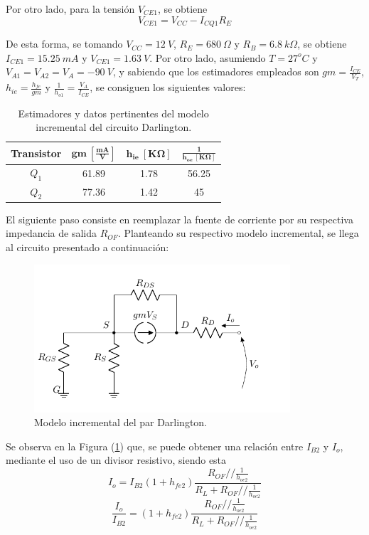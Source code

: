 Por otro lado, para la tensión $V_{CE1}$, se obtiene
\begin{equation}
	V_{CE1} = V_{CC} - I_{CQ1} R_E
\end{equation}

De esta forma, se tomando $V_{CC} = 12 \ V$, $R_E = 680 \ \Omega$ y $R_B = 6.8 \ k\Omega$, se obtiene $I_{CE1} = 15.25 \ mA$ y $V_{CE1} = 1.63 \ V$. Por otro lado, asumiendo $T = 27^o C$ y $V_{A1} = V_{A2} = V_A = -90 \ V$, y sabiendo que los estimadores empleados son $gm = \frac{I_{CE}}{V_T}$, $h_{ie} = \frac{h_{fe}}{gm}$ y $\frac{1}{h_{o1}} = \frac{V_A}{I_{CE}}$, se consiguen los siguientes valores:
\begin{table}[H]
\centering
\begin{tabular}{cccc}
\hline
\textbf{Transistor} & $\mathbf{gm \ \left[ \frac{mA}{V} \right]}$ & $\mathbf{h_{ie} \ \left[ K\Omega \right]}$ & $\mathbf{\frac{1}{h_{oe} \ \left[ K\Omega \right]}}$ \\
\hline
$Q_1$ & 61.89 & 1.78 & 56.25 \\
$Q_2$ & 77.36 & 1.42 & 45	\\
\hline
\end{tabular}
\caption{Estimadores y datos pertinentes del modelo incremental del circuito Darlington.}
\label{tab:estim}
\end{table}

El siguiente paso consiste en reemplazar la fuente de corriente por su respectiva impedancia de salida $R_{OF}$. Planteando su respectivo modelo incremental, se llega al circuito presentado a continuación: 
\begin{figure}[H]
\centering
	\includegraphics[width=0.85\textwidth, page=3]{Imagenes/ModeloIncremental.pdf}
	\caption{Modelo incremental del par Darlington.}
\label{fig:incdar}
\end{figure}

Se observa en la Figura (\ref{fig:incdar}) que, se puede obtener una relación entre $I_{B2}$ y $I_o$, mediante el uso de un divisor resistivo, siendo esta
\begin{equation*}
	I_o = I_{B2} \left( 1 + h_{fe2} \right) \frac{R_{OF} // \frac{1}{h_{oe2}}}{R_L + R_{OF} // \frac{1}{h_{oe2}}}
\end{equation*}
\begin{equation}
	\frac{I_o}{I_{B2}} = \left( 1 + h_{fe2} \right) \frac{R_{OF} // \frac{1}{h_{oe2}}}{R_L + R_{OF} // \frac{1}{h_{oe2}}}
	\label{equ:io-ib2}
\end{equation}

